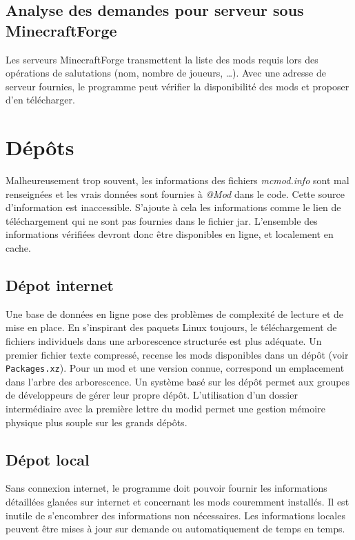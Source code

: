 \documentclass{article}
\begin{document}
\subsection{Analyse des demandes pour serveur sous MinecraftForge}
Les serveurs MinecraftForge transmettent la liste des mods requis lors des opérations de salutations (nom, nombre de joueurs, \dots).
Avec une adresse de serveur fournies, le programme peut vérifier la disponibilité des mods et proposer d'en télécharger.


\section{Dépôts}
\label{section:depot}
Malheureusement trop souvent, les informations des fichiers \textit{mcmod.info} sont mal renseignées et les vrais données sont fournies à \textit{@Mod} dans le code.
Cette source d'information est inaccessible.
S'ajoute à cela les informations comme le lien de téléchargement qui ne sont pas fournies dans le fichier jar.
L'ensemble des informations vérifiées devront donc être disponibles en ligne, et localement en cache.

\subsection{Dépot internet}
Une base de données en ligne pose des problèmes de complexité de lecture et de mise en place.
En s'inspirant des paquets Linux toujours, le téléchargement de fichiers individuels dans une arborescence structurée est plus adéquate.
Un premier fichier texte compressé, recense les mods disponibles dans un dépôt (voir \texttt{Packages.xz}).
Pour un mod et une version connue, correspond un emplacement dans l'arbre des arborescence.
Un système basé sur les dépôt permet aux groupes de développeurs de gérer leur propre dépôt.
L'utilisation d'un dossier intermédiaire avec la première lettre du modid permet une gestion mémoire physique plus souple sur les grands dépôts.

\subsection{Dépot local}
Sans connexion internet, le programme doit pouvoir fournir les informations détaillées glanées sur internet et concernant les mods couremment installés.
Il est inutile de s'encombrer des informations non nécessaires.
Les informations locales peuvent être mises à jour sur demande ou automatiquement de temps en temps.
\end{document}
